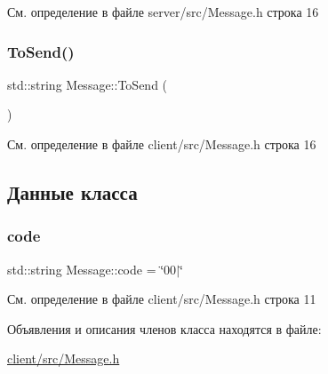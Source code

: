 См. определение в файле server/src/\+Message.\+h строка 16

\mbox{\label{class_message_a04d7d7a2d696dc3183a76fcde39ebd73}} 
\subsubsection{\texorpdfstring{ToSend()}{ToSend()}\hspace{0.1cm}{\footnotesize\ttfamily [2/2]}}
{\footnotesize\ttfamily std\+::string Message\+::\+To\+Send (\begin{DoxyParamCaption}{ }\end{DoxyParamCaption})\hspace{0.3cm}{\ttfamily [inline]}}



См. определение в файле client/src/\+Message.\+h строка 16



\subsection{Данные класса}
\mbox{\label{class_message_a23a66db51f9ec75f727b0838c5d65a55}} 
\subsubsection{\texorpdfstring{code}{code}}
{\footnotesize\ttfamily std\+::string Message\+::code = \char`\"{}00$\vert$\char`\"{}\hspace{0.3cm}{\ttfamily [protected]}}



См. определение в файле client/src/\+Message.\+h строка 11



Объявления и описания членов класса находятся в файле\+:\begin{DoxyCompactItemize}
\item 
\mbox{\hyperlink{client_2src_2_message_8h}{client/src/\+Message.\+h}}\end{DoxyCompactItemize}
